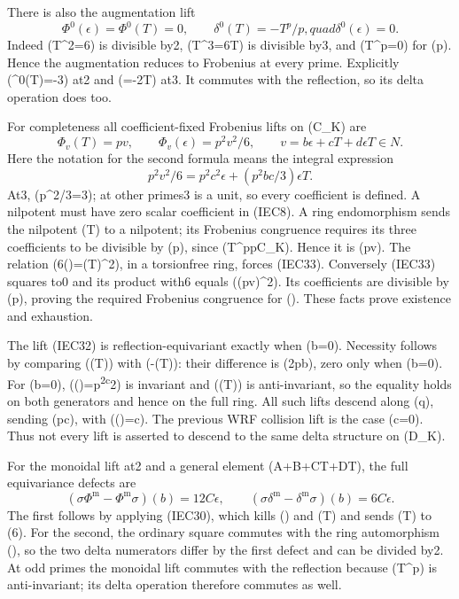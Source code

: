\documentclass[
  10pt,
]{article}
\begin{document}
There is also the augmentation lift \[
\Phi^0(\epsilon)=\Phi^0(T)=0,\qquad
\delta^0(T)=-T^p/p,quad\delta^0(\epsilon)=0.
\tag{IEC31}
\] Indeed (T\^{}2=6\epsilon) is divisible by2, (T\^{}3=6\epsilon T) is
divisible by3, and (T\^{}p=0) for (p). Hence the augmentation
reduces to Frobenius at every prime. Explicitly
(\delta\^{}0(T)=-3\epsilon) at2 and (=-2\epsilon T) at3. It commutes
with the reflection, so its delta operation does too.

For completeness all coefficient-fixed Frobenius lifts on (C\_K) are \[
\Phi_v(T)=p v,\qquad \Phi_v(\epsilon)=p^2v^2/6,
\qquad v=b\epsilon+cT+d\epsilon T\in N.
\tag{IEC32}
\] Here the notation for the second formula means the integral
expression \[
p^2v^2/6=p^2c^2\epsilon+(p^2bc/3)\epsilon T.
\tag{IEC33}
\] At3, (p\^{}2/3=3); at other primes3 is a unit, so every coefficient
is defined. A nilpotent must have zero scalar coefficient in (IEC8). A
ring endomorphism sends the nilpotent (T) to a nilpotent; its Frobenius
congruence requires its three coefficients to be divisible by (p), since
(T\^{}p\in pC\_K). Hence it is (pv). The relation
(6\Phi(\epsilon)=\Phi(T)\^{}2), in a torsionfree ring, forces (IEC33).
Conversely (IEC33) squares to0 and its product with6 equals ((pv)\^{}2).
Its coefficients are divisible by (p), proving the required Frobenius
congruence for (\epsilon). These facts prove existence and exhaustion.

The lift (IEC32) is reflection-equivariant exactly when (b=0). Necessity
follows by comparing (\sigma\Phi(T)) with (-\Phi(T)): their difference
is (2pb\epsilon), zero only when (b=0). For (b=0),
(\Phi(\epsilon)=p\textsuperscript{2c}2\epsilon) is invariant and
(\Phi(T)) is anti-invariant, so the equality holds on both generators
and hence on the full ring. All such lifts descend along (q), sending
(\eta\mapsto pc\eta), with (\delta(\eta)=c\eta). The previous WRF
collision lift is the case (c=0). Thus not every lift is asserted to
descend to the same delta structure on (D\_K).

For the monoidal lift at2 and a general element
(A+B\epsilon+CT+D\epsilon T), the full equivariance defects are \[
(\sigma\Phi^{\mathrm m}-\Phi^{\mathrm m}\sigma)(b)=12C\epsilon,
\qquad
(\sigma\delta^{\mathrm m}-\delta^{\mathrm m}\sigma)(b)=6C\epsilon.
\tag{IEC34}
\] The first follows by applying (IEC30), which kills (\epsilon) and
(\epsilon T) and sends (T) to (6\epsilon). For the second, the ordinary
square commutes with the ring automorphism (\sigma), so the two delta
numerators differ by the first defect and can be divided by2. At odd
primes the monoidal lift commutes with the reflection because (T\^{}p)
is anti-invariant; its delta operation therefore commutes as well.
\end{document}
